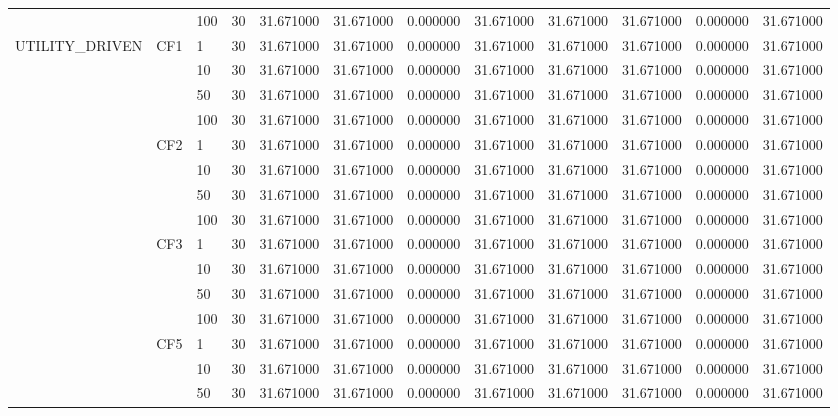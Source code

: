 \begin{tabular}{lllrrrrrrrrr}
 &  & 100 & 30 & 31.671000 & 31.671000 & 0.000000 & 31.671000 & 31.671000 & 31.671000 & 0.000000 & 31.671000 \\
\cline{1-12} \cline{2-12}
\multirow[t]{16}{*}{UTILITY_DRIVEN} & \multirow[t]{4}{*}{CF1} & 1 & 30 & 31.671000 & 31.671000 & 0.000000 & 31.671000 & 31.671000 & 31.671000 & 0.000000 & 31.671000 \\
 &  & 10 & 30 & 31.671000 & 31.671000 & 0.000000 & 31.671000 & 31.671000 & 31.671000 & 0.000000 & 31.671000 \\
 &  & 50 & 30 & 31.671000 & 31.671000 & 0.000000 & 31.671000 & 31.671000 & 31.671000 & 0.000000 & 31.671000 \\
 &  & 100 & 30 & 31.671000 & 31.671000 & 0.000000 & 31.671000 & 31.671000 & 31.671000 & 0.000000 & 31.671000 \\
\cline{2-12}
 & \multirow[t]{4}{*}{CF2} & 1 & 30 & 31.671000 & 31.671000 & 0.000000 & 31.671000 & 31.671000 & 31.671000 & 0.000000 & 31.671000 \\
 &  & 10 & 30 & 31.671000 & 31.671000 & 0.000000 & 31.671000 & 31.671000 & 31.671000 & 0.000000 & 31.671000 \\
 &  & 50 & 30 & 31.671000 & 31.671000 & 0.000000 & 31.671000 & 31.671000 & 31.671000 & 0.000000 & 31.671000 \\
 &  & 100 & 30 & 31.671000 & 31.671000 & 0.000000 & 31.671000 & 31.671000 & 31.671000 & 0.000000 & 31.671000 \\
\cline{2-12}
 & \multirow[t]{4}{*}{CF3} & 1 & 30 & 31.671000 & 31.671000 & 0.000000 & 31.671000 & 31.671000 & 31.671000 & 0.000000 & 31.671000 \\
 &  & 10 & 30 & 31.671000 & 31.671000 & 0.000000 & 31.671000 & 31.671000 & 31.671000 & 0.000000 & 31.671000 \\
 &  & 50 & 30 & 31.671000 & 31.671000 & 0.000000 & 31.671000 & 31.671000 & 31.671000 & 0.000000 & 31.671000 \\
 &  & 100 & 30 & 31.671000 & 31.671000 & 0.000000 & 31.671000 & 31.671000 & 31.671000 & 0.000000 & 31.671000 \\
\cline{2-12}
 & \multirow[t]{4}{*}{CF5} & 1 & 30 & 31.671000 & 31.671000 & 0.000000 & 31.671000 & 31.671000 & 31.671000 & 0.000000 & 31.671000 \\
 &  & 10 & 30 & 31.671000 & 31.671000 & 0.000000 & 31.671000 & 31.671000 & 31.671000 & 0.000000 & 31.671000 \\
 &  & 50 & 30 & 31.671000 & 31.671000 & 0.000000 & 31.671000 & 31.671000 & 31.671000 & 0.000000 & 31.671000 \\

\end{tabular}
